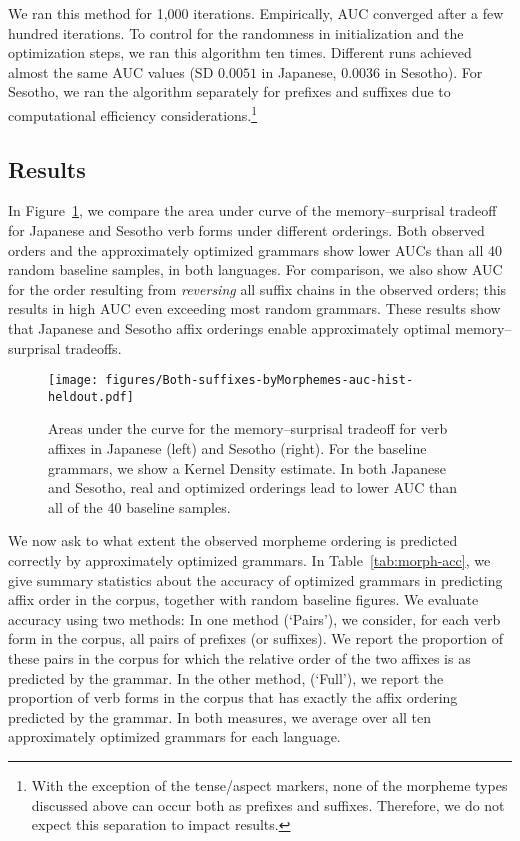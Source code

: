 We ran this method for 1,000 iterations. Empirically, AUC converged after a few hundred iterations.
To control for the randomness in initialization and the optimization steps, we ran this algorithm ten times.
Different runs achieved almost the same AUC values (SD $0.0051$ in Japanese, $0.0036$ in Sesotho). %
For Sesotho, we ran the algorithm separately for prefixes and suffixes due to computational efficiency considerations.\footnote{With the exception of the tense/aspect markers, none of the morpheme types discussed above can occur both as prefixes and suffixes. Therefore, we do not expect this separation to impact results.}

\subsection{Results}
In Figure~\ref{fig:morph-auc}, we compare the area under curve of the memory--surprisal tradeoff for Japanese and Sesotho verb forms under different orderings.
Both observed orders and the approximately optimized grammars show lower AUCs than all 40 random baseline samples, in both languages.
For comparison, we also show AUC for the order resulting from \emph{reversing} all suffix chains in the observed orders; this results in high AUC even exceeding most random grammars.
These results show that Japanese and Sesotho affix orderings enable approximately optimal memory--surprisal tradeoffs.



\begin{figure}
	\begin{center}
\texttt{[image: figures/Both-suffixes-byMorphemes-auc-hist-heldout.pdf]}
\end{center}
	\caption{Areas under the curve for the memory--surprisal tradeoff for verb affixes in Japanese (left) and Sesotho (right). For the baseline grammars, we show a Kernel Density estimate.
	In both Japanese and Sesotho, real and optimized orderings lead to lower AUC than all of the 40 baseline samples.}
	\label{fig:morph-auc}
\end{figure}



We now ask to what extent the observed morpheme ordering is predicted correctly by approximately optimized grammars.
In Table~\ref{tab:morph-acc}, we give summary statistics about the accuracy of optimized grammars in predicting affix order in the corpus, together with random baseline figures.
We evaluate accuracy using two methods:
In one method (`Pairs'), we consider, for each verb form in the corpus, all pairs of prefixes (or suffixes).
We report the proportion of these pairs in the corpus for which the relative order of the two affixes is as predicted by the grammar.
In the other method, (`Full'), we report the proportion of verb forms in the corpus that has exactly the affix ordering predicted by the grammar.
In both measures, we average over all ten approximately optimized grammars for each language.

